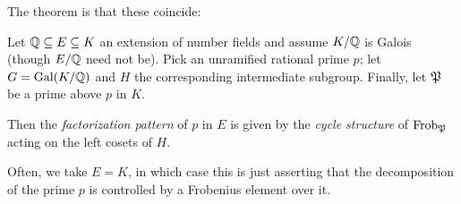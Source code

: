 The theorem is that these coincide:
\begin{theorem}
	\label{thm:frob_control_decomp}
	Let $\mathbb Q \subseteq E \subseteq K$ an extension of number fields
	and assume $K/\mathbb Q$ is Galois (though $E/\mathbb Q$ need not be).
	Pick an unramified rational prime $p$; let $G = \operatorname{Gal}(K/\mathbb Q)$
	and $H$ the corresponding intermediate subgroup.
	Finally, let $\mathfrak P$ be a prime above $p$ in $K$.

	Then the \emph{factorization pattern} of $p$ in $E$ is given by
	the \emph{cycle structure} of $\mathrm{Frob}_{\mathfrak P}$ acting on the left cosets of $H$.
\end{theorem}
Often, we take $E = K$, in which case this is just asserting
that the decomposition of the prime $p$ is controlled by a Frobenius element over it.

